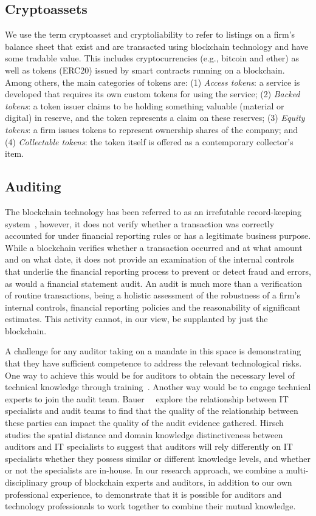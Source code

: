 \subsection{Cryptoassets}
We use the term cryptoasset and cryptoliability to refer to listings on a firm's balance sheet that exist and are transacted using blockchain technology and have some tradable value. This includes cryptocurrencies (e.g., bitcoin and ether) as well as tokens (\eg ERC20) issued by smart contracts running on a blockchain. Among others, the main categories of tokens are: (1) \textit{Access tokens}: a service is developed that requires its own custom tokens for using the service; (2) \textit{Backed tokens}: a token issuer claims to be holding something valuable (material or digital) in reserve, and the token represents a claim on these reserves; (3) \textit{Equity tokens}: a firm issues tokens to represent ownership shares of the company; and (4) \textit{Collectable tokens}: the token itself is offered as a contemporary collector's item. 


\subsection{Auditing}
The blockchain technology has been referred to as an irrefutable record-keeping system~\cite{crosby2016blockchain}, however, it does not verify whether a transaction was correctly accounted for under financial reporting rules or has a legitimate business purpose. While a blockchain verifies whether a transaction occurred and at what amount and on what date, it does not provide an examination of the internal controls that underlie the financial reporting process to prevent or detect fraud and errors, as would a financial statement audit. An audit is much more than a verification of routine transactions, being a holistic assessment of the robustness of a firm's internal controls, financial reporting policies and the reasonability of significant estimates. This activity cannot, in our view, be supplanted by just the blockchain.

A challenge for any auditor taking on a mandate in this space is demonstrating that they have sufficient competence to address the relevant technological risks. One way to achieve this would be for auditors to obtain the necessary level of technical knowledge through training~\cite{curtis2009auditors}. Another way would be to engage technical experts to join the audit team. Bauer~\etal~\cite{bauer2019one} explore the relationship between IT specialists and audit teams to find that the quality of the relationship between these parties can impact the quality of the audit evidence gathered. Hirsch~\cite{hirsch2020effect} studies the spatial distance and domain knowledge distinctiveness between auditors and IT specialists to suggest that auditors will rely differently on IT specialists whether they possess similar or different knowledge levels, and whether or not the specialists are in-house. In our research approach, we combine a multi-disciplinary group of blockchain experts and auditors, in addition to our own professional experience, to demonstrate that it is possible for auditors and technology professionals to work together to combine their mutual knowledge.

